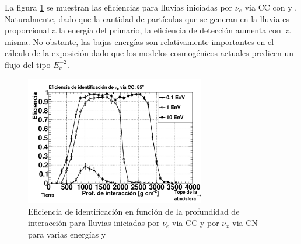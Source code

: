 	La figura \ref{fig:effDG_en} se muestran las eficiencias para lluvias iniciadas por $\nu_e$ via CC con  y .
	Naturalmente, dado que la cantidad de partículas que se generan en la lluvia es proporcional a la energía del primario, la eficiencia de detección aumenta con la misma.
	No obstante, las bajas energías son relativamente importantes en el cálculo de la exposición dado que los modelos cosmog\'enicos actuales predicen un flujo del tipo $E_\nu^{-2}$.
	\begin{figure}[ht!]
		\begin{center}
			\includegraphics[width=0.7\textwidth]{fig/resultadosAuger/eff_varios_85}
			\caption{Eficiencia de identificación en función de la profundidad de interacción para lluvias iniciadas por $\nu_e$ via CC y por $\nu_x$ via CN para varias energías y }
			\label{fig:effDG_en}
		\end{center}
	\end{figure}
	
